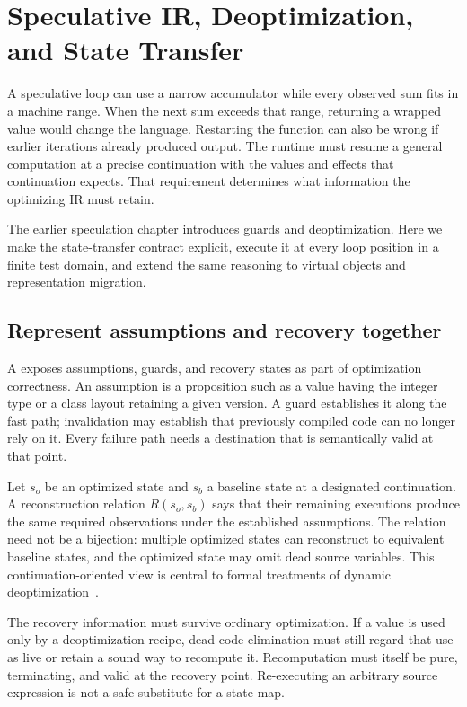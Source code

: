 \chapter{Speculative IR, Deoptimization, and State Transfer}
\label{ch:speculative-state-transfer}

A speculative loop can use a narrow accumulator while every observed sum fits in a machine range.
When the next sum exceeds that range, returning a wrapped value would change the language.
Restarting the function can also be wrong if earlier iterations already produced output.
The runtime must resume a general computation at a precise continuation with the values and effects that continuation expects.
That requirement determines what information the optimizing IR must retain.

The earlier speculation chapter introduces guards and deoptimization.
Here we make the state-transfer contract explicit, execute it at every loop position in a finite test domain, and extend the same reasoning to virtual objects and representation migration.

\section{Represent assumptions and recovery together}
\label{sec:ch66-contract}

A  exposes assumptions, guards, and recovery states as part of optimization correctness.
An assumption is a proposition such as a value having the integer type or a class layout retaining a given version.
A guard establishes it along the fast path; invalidation may establish that previously compiled code can no longer rely on it.
Every failure path needs a destination that is semantically valid at that point.

Let $s_o$ be an optimized state and $s_b$ a baseline state at a designated continuation.
A reconstruction relation $R(s_o,s_b)$ says that their remaining executions produce the same required observations under the established assumptions.
The relation need not be a bijection: multiple optimized states can reconstruct to equivalent baseline states, and the optimized state may omit dead source variables.
This continuation-oriented view is central to formal treatments of dynamic deoptimization~\cite{fluckiger-2018-deoptimization}.

The recovery information must survive ordinary optimization.
If a value is used only by a deoptimization recipe, dead-code elimination must still regard that use as live or retain a sound way to recompute it.
Recomputation must itself be pure, terminating, and valid at the recovery point.
Re-executing an arbitrary source expression is not a safe substitute for a state map.

